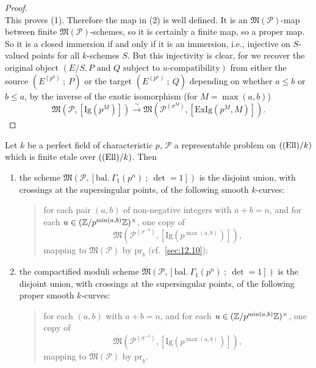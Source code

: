 \begin{proof}
\[\]
This proves (1). Therefore the map in (2) is well defined. It is an $\mathfrak{M}(\mathcal{P})$-map between finite $\mathfrak{M}(\mathcal{P})$-schemes, so it is certainly a finite map, so a proper map. So it is a closed immersion if and only if it is an immersion, i.e., injective on $S$-valued points for all $k$-schemes $S$. But this injectivity is clear, for we recover the original object $(E/S, P \text{ and } Q \text{ subject to } u\text{-compatibility})$ from either the source $(E^{(p^b)}\ ;\ P)$ or the target $(E^{(p^a)}\ ;\ Q)$ depending on whether $a \le b$ or $b \le a$, by the inverse of the exotic isomorphism (for $M = \max(a,b)$)
\[
\mathfrak{M}(\mathcal{P}, [\mathrm{Ig}(p^M)]) \xrightarrow{\ \sim\ } \mathfrak{M}(\mathcal{P}^{(\sigma^M)}, [\mathrm{ExIg}(p^M, M)]) .
\]
\end{proof}

\begin{kthm}\label{thm:13.11.4}
Let $k$ be a perfect field of characteristic $p$, $\mathcal{P}$ a representable problem on $((\mathrm{Ell})/k)$ which is finite etale over $((\mathrm{Ell})/k)$. Then
\begin{enumerate}[(1)]
\item the scheme $\mathfrak{M}(\mathcal{P}, [\mathrm{bal.\ }\Gamma_1(p^n)\ ;\ \det = 1])$ is the disjoint union, with crossings at the supersingular points, of the following smooth $k$-curves:
\begin{quote}
for each pair $(a,b)$ of non-negative integers with $a+b = n$, and for each $u \in (\mathbb{Z}/p^{\min(a,b)}\mathbb{Z})^\times$, one copy of
\[
\mathfrak{M}(\mathcal{P}^{(\sigma^{-b})}, [\mathrm{Ig}(p^{\max(a,b)})]) ,
\]
mapping to $\mathfrak{M}(\mathcal{P})$ by $\mathrm{pr}_b$ (cf.\ \ref{sec:12.10}):
\begin{center}
\end{center}
\end{quote}
\item the compactified moduli scheme $\overline{\mathfrak{M}}(\mathcal{P}, [\mathrm{bal.\ }\Gamma_1(p^n)\ ;\ \det = 1])$ is the disjoint union, with crossings at the supersingular points, of the following proper smooth $k$-curves:
\begin{quote}
for each $(a,b)$ with $a+b = n$, and for each $u \in (\mathbb{Z}/p^{\min(a,b)}\mathbb{Z})^\times$, one copy of
\[
\overline{\mathfrak{M}}(\mathcal{P}^{(\sigma^{-b})}, [\mathrm{Ig}(p^{\max(a,b)})]) ,
\]
mapping to $\overline{\mathfrak{M}}(\mathcal{P})$ by $\mathrm{pr}_b$.
\end{quote}
\end{enumerate}
\end{kthm}

